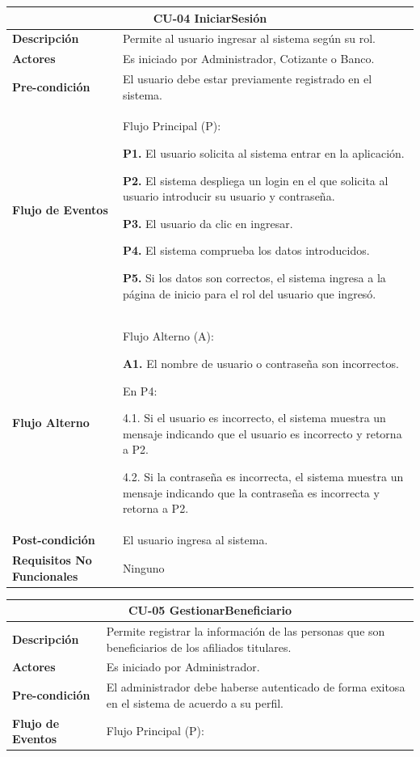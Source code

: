 \documentclass[12pt,a4paper]{article}
\begin{document}
\begin{center}
\begin{tabular}{|m{5.5cm}| m{9.5cm}|}
\hline 
\multicolumn{2}{|c|}{\textbf{CU-04 IniciarSesión}} \\ 
\hline 
\textbf{Descripción} & Permite al usuario ingresar al sistema según su rol. \\ 
\hline 
\textbf{Actores} & Es iniciado por Administrador, Cotizante o Banco. \\ 
\hline 
\textbf{Pre-condición} & El usuario debe estar previamente registrado en el sistema. \\ 
\hline 
\textbf{Flujo de Eventos} & Flujo Principal (P):

\textbf{P1.} El usuario solicita al sistema entrar en la aplicación.

\textbf{P2.} El sistema despliega un login en el que solicita al usuario introducir su usuario y contraseña.

\textbf{P3.} El usuario da clic en ingresar.

\textbf{P4.} El sistema comprueba los datos introducidos.

\textbf{P5.} Si los datos son correctos, el sistema ingresa a la página de inicio para el rol del usuario que ingresó.
\\
\hline 
\textbf{Flujo Alterno} &  Flujo Alterno (A):

\textbf{A1.} El nombre de usuario o contraseña son incorrectos.

	En P4:
	
	4.1. Si el usuario es incorrecto, el sistema muestra un mensaje indicando que el usuario es incorrecto y retorna a P2.
	
	4.2. Si la contraseña es incorrecta, el sistema muestra un mensaje indicando que la contraseña es incorrecta y retorna a P2. \\ 
\hline 
\textbf{Post-condición}  & El usuario ingresa al sistema. \\ 
\hline 
\textbf{Requisitos No Funcionales} & Ninguno \\ 
\hline 
\end{tabular}
\vspace{5mm}

\begin{tabular}{|m{5.5cm}| m{9.5cm}|}
\hline 
\multicolumn{2}{|c|}{\textbf{CU-05 GestionarBeneficiario}} \\ 
\hline 
\textbf{Descripción} & Permite registrar la información de las personas que son beneficiarios de los afiliados titulares. \\ 
\hline 
\textbf{Actores} & Es iniciado por Administrador. \\ 
\hline 
\textbf{Pre-condición} & El administrador debe haberse autenticado de forma exitosa en el sistema de acuerdo a su perfil. \\ 
\hline 
\textbf{Flujo de Eventos} & Flujo Principal (P):


\end{tabular}
\end{center}
\end{document}
